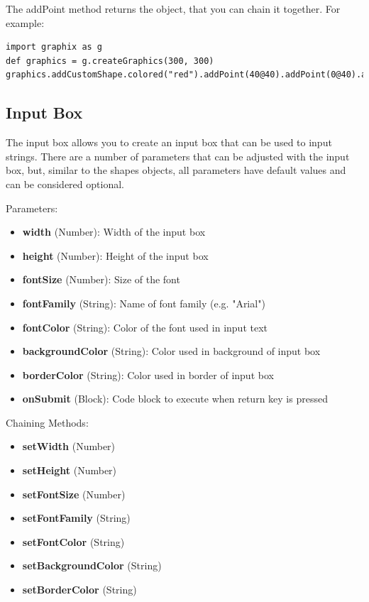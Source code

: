 \documentclass{article}
\begin{document}
The addPoint method returns the object, that you can chain it together. For example:
\begin{lstlisting}
import graphix as g
def graphics = g.createGraphics(300, 300)
graphics.addCustomShape.colored("red").addPoint(40@40).addPoint(0@40).addPoint(40@0).draw
\end{lstlisting}

\subsection{Input Box}
The input box allows you to create an input box that can be used to input strings. There are
a number of parameters that can be adjusted with the input box, but, similar to the shapes
objects, all parameters have default values and can be considered optional.

Parameters:
\begin{itemize}
\item \textbf{width} (Number): Width of the input box
\item \textbf{height} (Number): Height of the input box
\item \textbf{fontSize} (Number): Size of the font
\item \textbf{fontFamily} (String): Name of font family (e.g. "Arial")
\item \textbf{fontColor} (String): Color of the font used in input text
\item \textbf{backgroundColor} (String): Color used in background of input box
\item \textbf{borderColor} (String): Color used in border of input box
\item \textbf{onSubmit} (Block): Code block to execute when return key is pressed
\end{itemize}

Chaining Methods:
\begin{itemize}
\item \textbf{setWidth} (Number)
\item \textbf{setHeight} (Number)
\item \textbf{setFontSize} (Number)
\item \textbf{setFontFamily} (String)
\item \textbf{setFontColor} (String)
\item \textbf{setBackgroundColor} (String)
\item \textbf{setBorderColor} (String)
\end{itemize}
\end{document}
